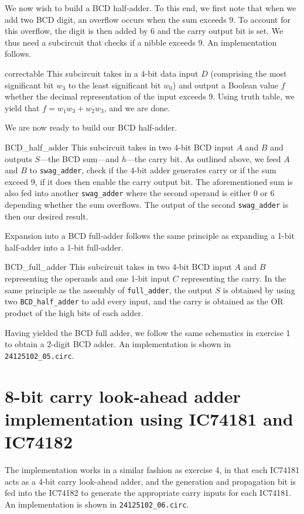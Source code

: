 \documentclass{exam}
\begin{document}
We now wish to build a BCD half-adder. To this end, we first note that when we add two BCD digit, an overflow occurs when the sum exceeds $9$. To account for this overflow, the digit is then added by $6$ and the carry output bit is set. We thus need a subcircuit that checks if a nibble exceeds $9$. An implementation follows.
\begin{subcircuit}{correctable}
	This subcircuit takes in a 4-bit data input $D$ (comprising the most significant bit $w_3$ to the least significant bit $w_0$) and output a Boolean value $f$ whether the decimal representation of the input exceeds 9. Using truth table, we yield that $f = w_1w_3 + w_2w_3$, and we are done.
\end{subcircuit}

We are now ready to build our BCD half-adder.
\begin{subcircuit}{BCD\_half\_adder}
	This subcircuit takes in two 4-bit BCD input $A$ and $B$ and outputs $S$---the BCD sum---and $h$---the carry bit. As outlined above, we feed $A$ and $B$ to \verb|swag_adder|, check if the 4-bit adder generates carry or if the sum exceed 9, if it does then enable the carry output bit. The aforementioned sum is also fed into another \verb|swag_adder| where the second operand is either $0$ or $6$ depending whether the sum overflows. The output of the second \verb|swag_adder| is then our desired result.
\end{subcircuit}

Expansion into a BCD full-adder follows the same principle as expanding a 1-bit half-adder into a 1-bit full-adder.
\begin{subcircuit}{BCD\_full\_adder}
	This subcircuit takes in two 4-bit BCD input $A$ and $B$ representing the operands and one 1-bit input $C$ representing the carry. In the same principle as the assembly of \verb|full_adder|, the output $S$ is obtained by using two \verb|BCD_half_adder| to add every input, and the carry is obtained as the OR product of the high bits of each adder.
\end{subcircuit}

Having yielded the BCD full adder, we follow the same schematics in exercise 1 to obtain a 2-digit BCD adder. An implementation is shown in \verb|24125102_05.circ|.

\section{8-bit carry look-ahead adder implementation using IC74181 and IC74182}
The implementation works in a similar fashion as exercise 4, in that each IC74181 acts as a 4-bit carry look-ahead adder, and the generation and propagation bit is fed into the IC74182 to generate the appropriate carry inputs for each IC74181. An implementation is shown in \verb|24125102_06.circ|.
\end{document}
